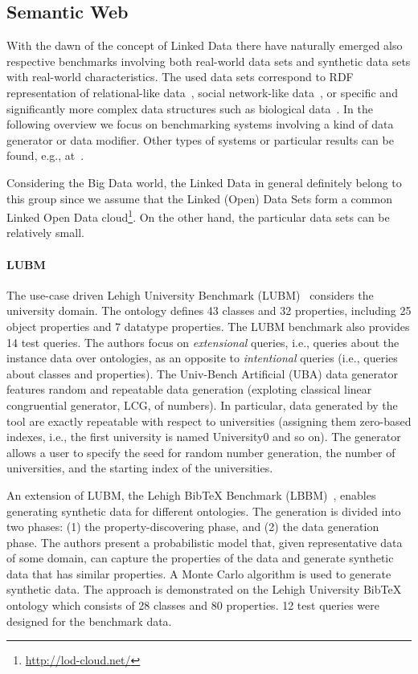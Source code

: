 \subsection{Semantic Web}
\label{sec:generators_LinkedData}
With the dawn of the concept of Linked Data there have naturally emerged also respective benchmarks involving both real-world data sets and synthetic data sets with real-world characteristics. The used data sets correspond to RDF representation of relational-like data~\cite{Guo2005158,Bizer09theberlin}, social network-like data~\cite{Schmidt2010}, or specific and significantly more complex data structures such as biological data~\cite{Wu2014}. In the following overview we focus on benchmarking systems involving a kind of data generator or data modifier. Other types of systems or particular results can be found, e.g., at~\cite{RdfStoreBenchmarking}.

Considering the Big Data world, the Linked Data in general definitely belong to this group since we assume that the Linked (Open) Data Sets form a common Linked Open Data cloud\footnote{\url{http://lod-cloud.net/}}. On the other hand, the particular data sets can be relatively small.

\paragraph{LUBM} The use-case driven Lehigh University Benchmark (LUBM)~\cite{Guo2005158} considers the university domain. The ontology defines 43 classes and 32 properties, including 25 object properties and 7 datatype properties. The LUBM benchmark also provides 14 test queries. The authors focus on \emph{extensional} queries, i.e., queries about the instance data over ontologies, as an opposite to \emph{intentional} queries (i.e., queries about classes and properties). The Univ-Bench Artificial  (UBA) data generator features random and repeatable data generation (exploting classical linear congruential generator, LCG, of numbers). In particular, data generated by the tool are exactly repeatable with respect to universities (assigning them zero-based indexes, i.e., the first university is named University0 and so on).  The generator allows a user to specify the seed for random number generation, the number of universities, and the starting index of the universities.

An extension of LUBM, the Lehigh BibTeX Benchmark (LBBM)~\cite{Wang2005}, enables generating synthetic data for different ontologies. The generation is divided into two phases: (1) the property-discovering phase, and (2) the data generation phase. The authors present a probabilistic model that, given representative data of some domain, can capture the properties of the data and generate synthetic data that has similar properties. A Monte Carlo algorithm is used to generate synthetic data. The approach is demonstrated on the Lehigh University BibTeX ontology which consists of 28 classes and 80 properties. 12 test queries were designed for  the benchmark data.

